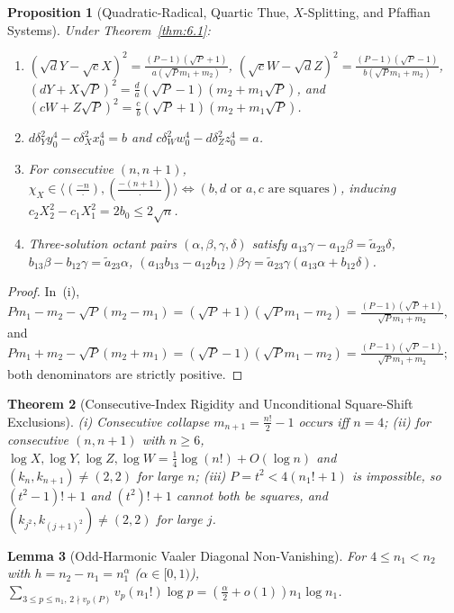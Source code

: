 \documentclass[11pt,reqno]{amsart}
\newtheorem{theorem}{Theorem}[section]
\newtheorem{lemma}[theorem]{Lemma}
\newtheorem{proposition}[theorem]{Proposition}
\theoremstyle{remark}
\begin{document}
\begin{proposition}[Quadratic-Radical, Quartic Thue, $X$-Splitting, and Pfaffian Systems]\label{prop:6.2}
Under Theorem~\ref{thm:6.1}:
\begin{enumerate}
\item[(i)] $(\sqrt{d}Y - \sqrt{c}X)^2 = \frac{(P-1)(\sqrt{P}+1)}{a(\sqrt{P}m_1+m_2)}$, $(\sqrt{c}W - \sqrt{d}Z)^2 = \frac{(P-1)(\sqrt{P}-1)}{b(\sqrt{P}m_1+m_2)}$, $(dY + X\sqrt{P})^2 = \frac{d}{a}(\sqrt{P}-1)(m_2 + m_1\sqrt{P})$, and $(cW + Z\sqrt{P})^2 = \frac{c}{b}(\sqrt{P}+1)(m_2 + m_1\sqrt{P})$.
\item[(ii)] $d\delta_Y^2 y_0^4 - c\delta_X^2 x_0^4 = b$ and $c\delta_W^2 w_0^4 - d\delta_Z^2 z_0^4 = a$.
\item[(iii)] For consecutive $(n, n+1)$, $\chi_X \in \langle(\frac{-n}{\cdot}), (\frac{-(n+1)}{\cdot})\rangle \iff (b,d \text{ or } a,c \text{ are squares})$, inducing $c_2 X_2^2 - c_1 X_1^2 = 2b_0 \le 2\sqrt{n}$.
\item[(iv)] Three-solution octant pairs $(\alpha, \beta, \gamma, \delta)$ satisfy $a_{13}\gamma - a_{12}\beta = \tilde{a}_{23}\delta$, $b_{13}\beta - b_{12}\gamma = \tilde{a}_{23}\alpha$, $(a_{13}b_{13} - a_{12}b_{12})\beta\gamma = \tilde{a}_{23}\gamma(a_{13}\alpha + b_{12}\delta)$.
\end{enumerate}
\end{proposition}
\begin{proof}
In~(i), $P m_1 - m_2 - \sqrt{P}(m_2 - m_1) = (\sqrt{P}+1)(\sqrt{P}m_1 - m_2) = \frac{(P-1)(\sqrt{P}+1)}{\sqrt{P}m_1 + m_2}$, and $P m_1 + m_2 - \sqrt{P}(m_2 + m_1) = (\sqrt{P}-1)(\sqrt{P}m_1 - m_2) = \frac{(P-1)(\sqrt{P}-1)}{\sqrt{P}m_1 + m_2}$; both denominators are strictly positive.
\end{proof}

\begin{theorem}[Consecutive-Index Rigidity and Unconditional Square-Shift Exclusions]\label{thm:6.3}
(i) Consecutive collapse $m_{n+1} = \frac{n!}{2} - 1$ occurs iff $n = 4$; (ii) for consecutive $(n, n+1)$ with $n \ge 6$, $\log X, \log Y, \log Z, \log W = \frac{1}{4}\log(n!) + O(\log n)$ and $(k_n, k_{n+1}) \ne (2, 2)$ for large $n$; (iii) $P = t^2 < 4(n_1! + 1)$ is impossible, so $(t^2-1)!+1$ and $(t^2)!+1$ cannot both be squares, and $(k_{j^2}, k_{(j+1)^2}) \ne (2, 2)$ for large $j$.
\end{theorem}

\begin{lemma}[Odd-Harmonic Vaaler Diagonal Non-Vanishing]\label{lem:6.4}
For $4 \le n_1 < n_2$ with $h = n_2 - n_1 = n_1^\alpha$ ($\alpha \in [0, 1)$), $\sum_{3 \le p \le n_1,\, 2 \nmid v_p(P)} v_p(n_1!)\log p = (\frac{\alpha}{2} + o(1))n_1\log n_1$.
\end{lemma}
\end{document}

